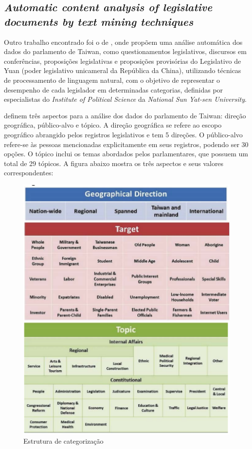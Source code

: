 \subsection{\textit{Automatic content analysis of legislative documents by text mining techniques}}

Outro trabalho encontrado foi o de , onde propõem uma análise automática dos dados do parlamento de Taiwan, como questionamentos legislativos, discursos em conferências, proposições legislativas e proposições provisórias do Legislativo de Yuan (poder legislativo unicameral da República da China), utilizando técnicas de processamento de linguagem natural, com o objetivo de representar o desempenho de cada legislador em determinadas categorias, definidas por especialistas do \textit{Institute of Political Science} da \textit{National Sun Yat-sen University}.

 definem três aspectos para a análise dos dados do parlamento de Taiwan: direção geográfica, público-alvo e tópico. A direção geográfica se refere ao escopo geográfico abrangido pelos registros legislativos e tem 5 direções. O público-alvo refere-se às pessoas mencionadas explicitamente em seus registros, podendo ser 30 opções. O tópico inclui os temas abordados pelos parlamentares, que possuem um total de 29 tópicos. A figura abaixo mostra os três aspectos e seus valores correspondentes:

\clearpage

\begin{figure}[h]
    \centering
    \includegraphics[scale=0.5]{figuras/aspects.eps}
    \caption{Estrutura de categorização}
\end{figure}


